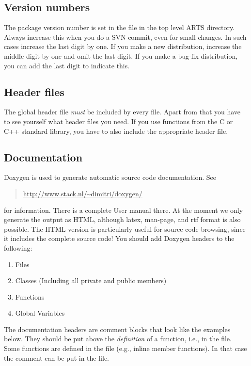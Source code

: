 \subsection{Version numbers} 
The package version number is set in the  file in the
top level ARTS directory. Always increase this when you do a SVN
commit, even for small changes. In such cases increase the last digit
by one. If you make a new distribution, increase the middle digit by
one and omit the last digit. If you make a bug-fix distribution, you
can add the last digit to indicate this. 

\subsection{Header files} 
The global header file  \emph{must} be included by every
file. Apart from that you have to see yourself what header files you
need. If you use functions from the C or C++ standard library, you
have to also include the appropriate header file.

\subsection{Documentation}
Doxygen is used to generate automatic source code documentation. See
\begin{quote}
  \url{http://www.stack.nl/\~dimitri/doxygen/}
\end{quote}
for information. There is a complete User manual there. At the moment
we only generate the output as HTML, although latex, man-page, and rtf
format is also possible. The HTML version is particularly useful for
source code browsing, since it includes the complete source code! You
should add Doxygen headers to the following:

\begin{enumerate}
\item Files
\item Classes (Including all private and public members)
\item Functions
\item Global Variables
\end{enumerate}

The documentation headers are comment blocks that look like the
examples below. They should be put above the \emph{definition} of a
function, i.e., in the  file.  Some functions are defined in
the  file (e.g., inline member functions). In that case the
comment can be put in the  file.

